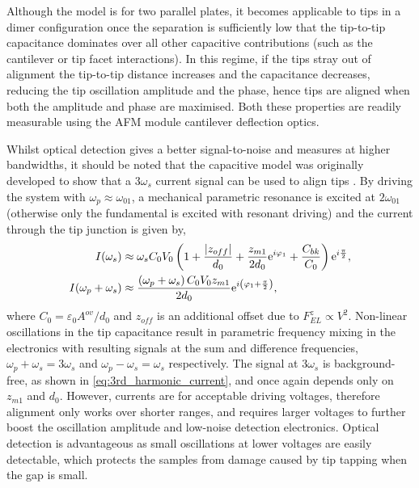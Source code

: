 \documentclass{article}
\begin{document}
Although the model is for two parallel plates, it becomes applicable to tips in a dimer configuration once the separation is sufficiently low that the tip-to-tip capacitance dominates over all other capacitive contributions (such as the cantilever or tip facet interactions). In this regime, if the tips stray out of alignment the tip-to-tip distance increases and the capacitance decreases, reducing the tip oscillation amplitude and the phase, hence tips are aligned when both the amplitude and phase are maximised. Both these properties are readily measurable using the AFM module cantilever deflection optics.

Whilst optical detection gives a better signal-to-noise and measures at higher bandwidths, it should be noted that the capacitive model was originally developed to show that a $3\omega_s$ current signal can be used to align tips \cite{savage2011}. By driving the system with $\omega_p \approx \omega_{01}$, a mechanical parametric resonance is excited at $2\omega_{01}$ (otherwise only the fundamental is excited with resonant driving) and the current through the tip junction is given by,
\begin{subequations}
\begin{align}
I(\omega_{s}) & \approx \omega_{s}C_{0}V_{0} \left(1+\frac{|z_{off}|}{d_{0}}+\frac{z_{m1}}{2d_{0}}\e^{i\varphi_1}+\frac{C_{bk}}{C_{0}}\right)\e^{i\frac{\pi}{2}},\\
%
I(\omega_{p}+\omega_{s}) & \approx \frac{\left(\omega_{p}+\omega_{s}\right)C_{0}V_{0}z_{m1}}{2d_{0}} \e^{i\left(\varphi_1 + \frac{\pi}{2}\right)},
\label{eq:3rd_harmonic_current}
\end{align}
\end{subequations}
where $C_0 = \varepsilon_0 A^{ov} / d_0$ and $z_{off}$ is an additional offset due to $F_{EL}^z \propto V^2$. Non-linear oscillations in the tip capacitance result in parametric frequency mixing in the electronics with resulting signals at the sum and difference frequencies, $\omega_{p}+\omega_{s}=3\omega_{s}$ and $\omega_{p}-\omega_{s}=\omega_{s}$ respectively. The signal at $3\omega_{s}$ is background-free, as shown in \eqref{eq:3rd_harmonic_current}, and once again depends only on $z_{m1}$ and $d_{0}$. However, currents are  for acceptable driving voltages, therefore alignment only works over shorter ranges, and requires larger voltages to further boost the oscillation amplitude and low-noise detection electronics. Optical detection is advantageous as small oscillations at lower voltages are easily detectable, which protects the samples from damage caused by tip tapping when the gap is small.
\end{document}
